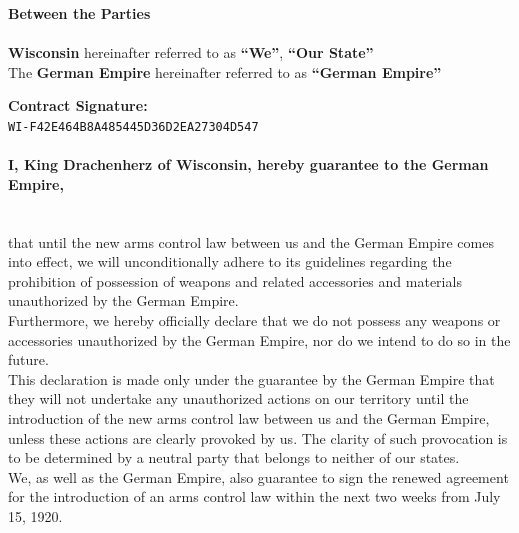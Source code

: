 \documentclass{article}
\begin{document}
\begin{center}
\begin{minipage}{0.45\textwidth}
    \end{minipage}
\end{center}

\begin{center}
    \textbf{Between the Parties\\}\textbf{\\}
    \textbf{Wisconsin} hereinafter referred to as \textbf{``We''}, \textbf{``Our State''\\}
    The \textbf{German Empire} hereinafter referred to as \textbf{``German Empire''\\}\end{center}
\newpage
{}
\vspace*{\fill}
\begin{Center}
\textbf{Contract Signature:\\}
\texttt{WI-F42E464B8A485445D36D2EA27304D547}
\vspace*{\fill}
\end{Center}
\newpage
\vspace*{\fill}
\paragraph{I, King Drachenherz of Wisconsin, hereby guarantee to the German Empire,\\\\}
that until the new arms control law between us and the German Empire comes into effect,
we will unconditionally adhere to its guidelines regarding the prohibition of possession of weapons and related accessories
and materials unauthorized by the German Empire.\\
Furthermore, we hereby officially declare that we do not possess any weapons or accessories unauthorized by the German Empire,
nor do we intend to do so in the future.\\
This declaration is made only under the guarantee by the German Empire that they will not undertake any unauthorized actions
on our territory until the introduction of the new arms control law between us and the German Empire, unless these actions are clearly provoked by us. The clarity of such provocation is to be determined by a neutral party that belongs to neither of our states.\\
We, as well as the German Empire, also guarantee to sign the renewed agreement for the introduction of an arms control law within the next two weeks from July 15, 1920.
\vspace*{\fill}
\end{document}
